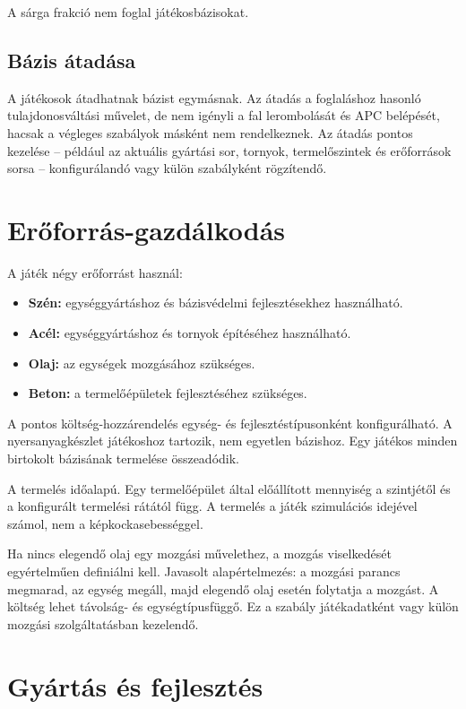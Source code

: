\documentclass[12pt,a4paper]{article}
\begin{document}
A sárga frakció nem foglal játékosbázisokat.

\subsection{Bázis átadása}

A játékosok átadhatnak bázist egymásnak. Az átadás a foglaláshoz hasonló tulajdonosváltási művelet, de nem igényli a fal lerombolását és APC belépését, hacsak a végleges szabályok másként nem rendelkeznek. Az átadás pontos kezelése – például az aktuális gyártási sor, tornyok, termelőszintek és erőforrások sorsa – konfigurálandó vagy külön szabályként rögzítendő.

\section{Erőforrás-gazdálkodás}

A játék négy erőforrást használ:
\begin{itemize}
  \item \textbf{Szén:} egységgyártáshoz és bázisvédelmi fejlesztésekhez használható.
  \item \textbf{Acél:} egységgyártáshoz és tornyok építéséhez használható.
  \item \textbf{Olaj:} az egységek mozgásához szükséges.
  \item \textbf{Beton:} a termelőépületek fejlesztéséhez szükséges.
\end{itemize}

A pontos költség-hozzárendelés egység- és fejlesztéstípusonként konfigurálható. A nyersanyagkészlet játékoshoz tartozik, nem egyetlen bázishoz. Egy játékos minden birtokolt bázisának termelése összeadódik.

A termelés időalapú. Egy termelőépület által előállított mennyiség a szintjétől és a konfigurált termelési rátától függ. A termelés a játék szimulációs idejével számol, nem a képkockasebességgel.

Ha nincs elegendő olaj egy mozgási művelethez, a mozgás viselkedését egyértelműen definiálni kell. Javasolt alapértelmezés: a mozgási parancs megmarad, az egység megáll, majd elegendő olaj esetén folytatja a mozgást. A költség lehet távolság- és egységtípusfüggő. Ez a szabály játékadatként vagy külön mozgási szolgáltatásban kezelendő.

\section{Gyártás és fejlesztés}
\end{document}
